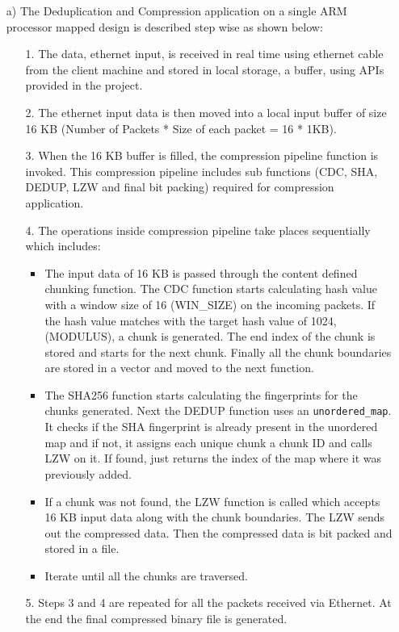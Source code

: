 \documentclass[../main.tex]{subfiles}
\begin{document}
\begin{enumerate}
    \item [a)] The Deduplication and Compression application on a single ARM
    processor mapped design is described step wise as shown below: \begin{enumerate}
        \item[1.] The data, ethernet input, is received in real time using ethernet cable from the client machine and stored in local storage, a buffer, using APIs provided in the project.
        \item[2.] The ethernet input data is then moved into a local input buffer of size 16 KB (Number of Packets * Size of each packet = 16 * 1KB).
        \item[3.] When the 16 KB buffer is filled, the compression pipeline function is invoked. This compression pipeline includes sub functions (CDC, SHA, DEDUP, LZW and final bit packing) required for compression application.
        \item [4.] The operations inside compression pipeline take places sequentially which includes:
        \begin{itemize}
            \item The input data of 16 KB is passed through the content defined chunking function. The CDC function starts calculating hash value with a window size of 16 (WIN\_SIZE) on the incoming packets. If the hash value matches with the target hash value of 1024, (MODULUS), a chunk is generated. The end index of the chunk is stored and starts for the next chunk. Finally all the chunk boundaries are stored in a vector and moved to the next function.
            \item The SHA256 function starts calculating the fingerprints for the chunks generated. Next the DEDUP function uses an \texttt{unordered\_map}. It checks if the SHA fingerprint is already present in the unordered map and if not, it assigns each unique chunk a chunk ID and calls LZW on it. If found, just returns the index of the map where it was previously added.
            \item If a chunk was not found, the LZW function is called which accepts 16 KB input data along with the chunk boundaries. The LZW sends out the compressed data. Then the compressed data is bit packed and stored in a file. 
            \item Iterate until all the chunks are traversed.
        \end{itemize}
        \item[5.] Steps 3 and 4 are repeated for all the packets received via Ethernet. At the end the final compressed binary file is generated. 
    \end{enumerate}
    

\end{enumerate}
\end{document}
